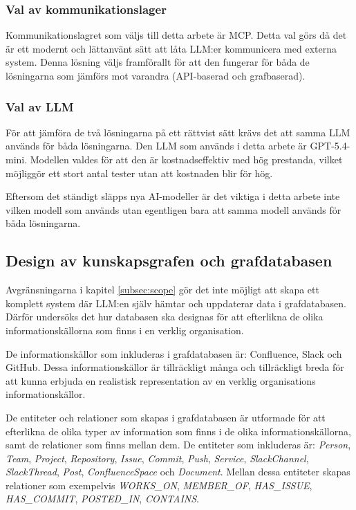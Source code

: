 \subsubsection{Val av kommunikationslager}
Kommunikationslagret som väljs till detta arbete är MCP. Detta val görs då det är ett modernt och lättanvänt sätt att låta LLM:er kommunicera med externa system.
Denna lösning väljs framförallt för att den fungerar för båda de lösningarna som jämförs mot varandra (API-baserad och grafbaserad).

\subsubsection{Val av LLM}
För att jämföra de två lösningarna på ett rättvist sätt krävs det att samma LLM används för båda lösningarna. 
Den LLM som används i detta arbete är GPT-5.4-mini. Modellen valdes för att den är kostnadseffektiv med hög prestanda, vilket möjliggör ett stort antal tester utan att kostnaden blir för hög.

Eftersom det ständigt släpps nya AI-modeller är det viktiga i detta arbete inte vilken modell som används utan egentligen bara att samma modell används för båda lösningarna.

\subsection{Design av kunskapsgrafen och grafdatabasen}\label{subsec:dkg}
Avgränsningarna i kapitel \ref{subsec:scope} gör det inte möjligt att skapa ett komplett system där LLM:en själv hämtar och uppdaterar data i grafdatabasen.
Därför undersöks det hur databasen ska designas för att efterlikna de olika informationskällorna som finns i en verklig organisation.

De informationskällor som inkluderas i grafdatabasen är: Confluence, Slack och GitHub.
 Dessa informationskällor är tillräckligt många och tillräckligt breda för att kunna erbjuda en realistisk representation av en verklig organisations informationskällor.

De entiteter och relationer som skapas i grafdatabasen är utformade för att efterlikna de olika typer av information som finns i de olika informationskällorna, samt de relationer som finns mellan dem.
De entiteter som inkluderas är: \textit{Person}, \textit{Team}, 
\textit{Project}, \textit{Repository}, \textit{Issue}, \textit{Commit}, \textit{Push}, \textit{Service},
\textit{SlackChannel}, \textit{SlackThread}, \textit{Post}, \textit{ConfluenceSpace} och
\textit{Document}. Mellan dessa entiteter skapas relationer som exempelvis \textit{WORKS\_ON}, \textit{MEMBER\_OF}, \textit{HAS\_ISSUE}, \textit{HAS\_COMMIT}, \textit{POSTED\_IN}, \textit{CONTAINS}.

